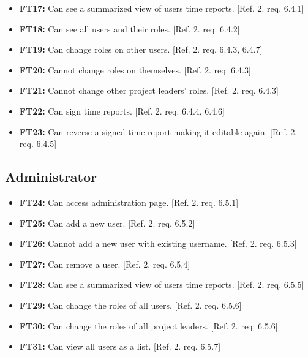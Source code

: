 \documentclass{article}
\begin{document}
			\begin{itemize}
			
			\item \textbf{FT17:} Can see a summarized view of users time reports. [Ref. 2. req. 6.4.1]
			
  			\item \textbf{FT18:} Can see all users and their roles. [Ref. 2. req. 6.4.2]

  			\item \textbf{FT19:} Can change roles on other users. [Ref. 2. req. 6.4.3, 6.4.7]
  			
  			\item \textbf{FT20:} Cannot change roles on themselves. [Ref. 2. req. 6.4.3]
  			
  			\item \textbf{FT21:} Cannot change other project leaders' roles. [Ref. 2. req. 6.4.3]
  			
  			\item \textbf{FT22:} Can sign time reports. [Ref. 2. req. 6.4.4, 6.4.6]
  			
  			\item \textbf{FT23:} Can reverse a signed time report making it editable again. [Ref. 2. req. 6.4.5]

		\end{itemize}
		
		\subsection{Administrator}
		
			\begin{itemize}
			
	
			\item \textbf{FT24:} Can access administration page. [Ref. 2. req. 6.5.1]			
			
  			\item \textbf{FT25:} Can add a new user. [Ref. 2. req. 6.5.2]
  		
  			\item \textbf{FT26:} Cannot add a new user with existing username. [Ref. 2. req. 6.5.3]

  			\item \textbf{FT27:} Can remove a user. [Ref. 2. req. 6.5.4]
  			
  			\item \textbf{FT28:} Can see a summarized view of users time reports. [Ref. 2. req. 6.5.5]  		  			
  			\item \textbf{FT29:} Can change the roles of all users. [Ref. 2. req. 6.5.6]
  			
  			\item \textbf{FT30:} Can change the roles of all project leaders. [Ref. 2. req. 6.5.6]
  			
  			\item \textbf{FT31:} Can view all users as a list. [Ref. 2. req. 6.5.7]

		\end{itemize}
		
\end{document}
